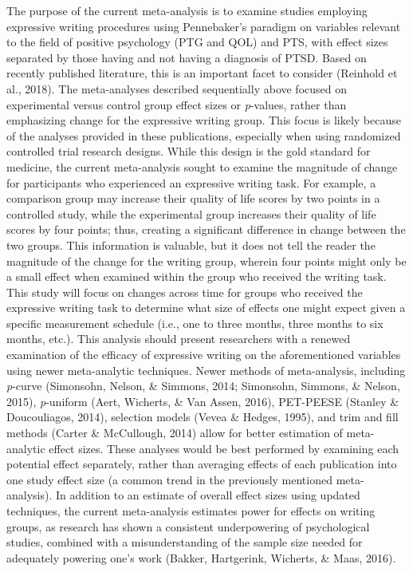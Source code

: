 \documentclass[english,man, mask]{apa6}
\theoremstyle{definition}
\theoremstyle{definition}
\theoremstyle{definition}
\theoremstyle{remark}
\begin{document}
The purpose of the current meta-analysis is to examine studies employing
expressive writing procedures using Pennebaker's paradigm on variables
relevant to the field of positive psychology (PTG and QOL) and PTS, with
effect sizes separated by those having and not having a diagnosis of
PTSD. Based on recently published literature, this is an important facet
to consider (Reinhold et al., 2018). The meta-analyses described
sequentially above focused on experimental versus control group effect
sizes or \emph{p}-values, rather than emphasizing change for the
expressive writing group. This focus is likely because of the analyses
provided in these publications, especially when using randomized
controlled trial research designs. While this design is the gold
standard for medicine, the current meta-analysis sought to examine the
magnitude of change for participants who experienced an expressive
writing task. For example, a comparison group may increase their quality
of life scores by two points in a controlled study, while the
experimental group increases their quality of life scores by four
points; thus, creating a significant difference in change between the
two groups. This information is valuable, but it does not tell the
reader the magnitude of the change for the writing group, wherein four
points might only be a small effect when examined within the group who
received the writing task. This study will focus on changes across time
for groups who received the expressive writing task to determine what
size of effects one might expect given a specific measurement schedule
(i.e., one to three months, three months to six months, etc.). This
analysis should present researchers with a renewed examination of the
efficacy of expressive writing on the aforementioned variables using
newer meta-analytic techniques. Newer methods of meta-analysis,
including \emph{p}-curve (Simonsohn, Nelson, \& Simmons, 2014;
Simonsohn, Simmons, \& Nelson, 2015), \emph{p}-uniform (Aert, Wicherts,
\& Van Assen, 2016), PET-PEESE (Stanley \& Doucouliagos, 2014),
selection models (Vevea \& Hedges, 1995), and trim and fill methods
(Carter \& McCullough, 2014) allow for better estimation of
meta-analytic effect sizes. These analyses would be best performed by
examining each potential effect separately, rather than averaging
effects of each publication into one study effect size (a common trend
in the previously mentioned meta-analysis). In addition to an estimate
of overall effect sizes using updated techniques, the current
meta-analysis estimates power for effects on writing groups, as research
has shown a consistent underpowering of psychological studies, combined
with a misunderstanding of the sample size needed for adequately
powering one's work (Bakker, Hartgerink, Wicherts, \& Maas, 2016).
\end{document}
